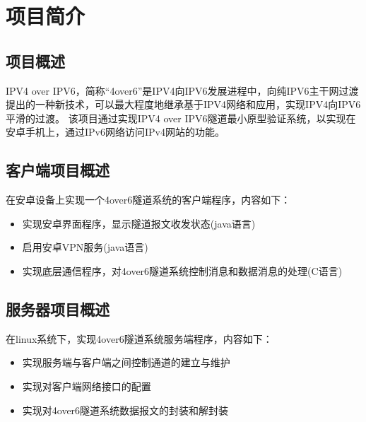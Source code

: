 \chapter{项目简介}


\section{项目概述}

IPV4 over IPV6，简称“4over6”是IPV4向IPV6发展进程中，向纯IPV6主干网过渡提出的一种新技术，可以最大程度地继承基于IPV4网络和应用，实现IPV4向IPV6平滑的过渡。
该项目通过实现IPV4 over IPV6隧道最小原型验证系统，以实现在安卓手机上，通过IPv6网络访问IPv4网站的功能。 




\section{客户端项目概述}
在安卓设备上实现一个4over6隧道系统的客户端程序，内容如下：

\begin{itemize}
    \item 实现安卓界面程序，显示隧道报文收发状态(java语言)
    \item 启用安卓VPN服务(java语言)
    \item 实现底层通信程序，对4over6隧道系统控制消息和数据消息的处理(C语言)
\end{itemize}

\section{服务器项目概述}

在linux系统下，实现4over6隧道系统服务端程序，内容如下：
\begin{itemize}
    \item 实现服务端与客户端之间控制通道的建立与维护
    \item 实现对客户端网络接口的配置
    \item 实现对4over6隧道系统数据报文的封装和解封装
\end{itemize}